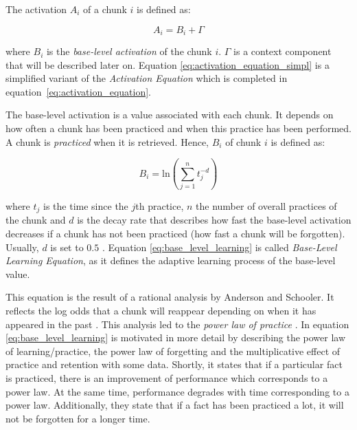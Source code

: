 The activation $A_i$ of a chunk $i$ is defined as:

\begin{equation}
 \label{eq:activation_equation_simpl}
 A_i = B_i + \Gamma
\end{equation}

where $B_i$ is the \emph{base-level activation} of the chunk $i$. $\Gamma$ is a context component that will be described later on. Equation \eqref{eq:activation_equation_simpl} is a simplified variant of the \emph{Activation Equation} which is completed in equation~\eqref{eq:activation_equation}.

The base-level activation is a value associated with each chunk. It depends on how often a chunk has been practiced and when this practice has been performed. A chunk is \emph{practiced} when it is retrieved. Hence, $B_i$ of chunk $i$ is defined as:

\begin{equation}
\label{eq:base_level_learning}
B_i = \mathrm{ln}\left(\sum_{j=1}^n{t_j^{-d}}\right)
\end{equation}

where $t_j$ is the time since the $j$th practice, $n$ the number of overall practices of the chunk and $d$ is the decay rate that describes how fast the base-level activation decreases if a chunk has not been practiced (how fast a chunk will be forgotten). Usually, $d$ is set to $0.5$ \cite[p. 1042]{anderson_integrated_2004}. Equation \eqref{eq:base_level_learning} is called \emph{Base-Level Learning Equation}, as it defines the adaptive learning process of the base-level value.

This equation is the result of a rational analysis by Anderson and Schooler. It reflects the log odds that a chunk will reappear depending on when it has appeared in the past \cite[33]{taatgen_modeling_2006}. This analysis led to the \emph{power law of practice} \cite[1042]{anderson_integrated_2004}. In \cite[8--11]{anderson_implications_2000} equation \eqref{eq:base_level_learning} is motivated in more detail by describing the power law of learning/practice, the power law of forgetting and the multiplicative effect of practice and retention with some data. Shortly, it states that if a particular fact is practiced, there is an improvement of performance which corresponds to a power law. At the same time, performance degrades with time corresponding to a power law. Additionally, they state that if a fact has been practiced a lot, it will not be forgotten for a longer time.

